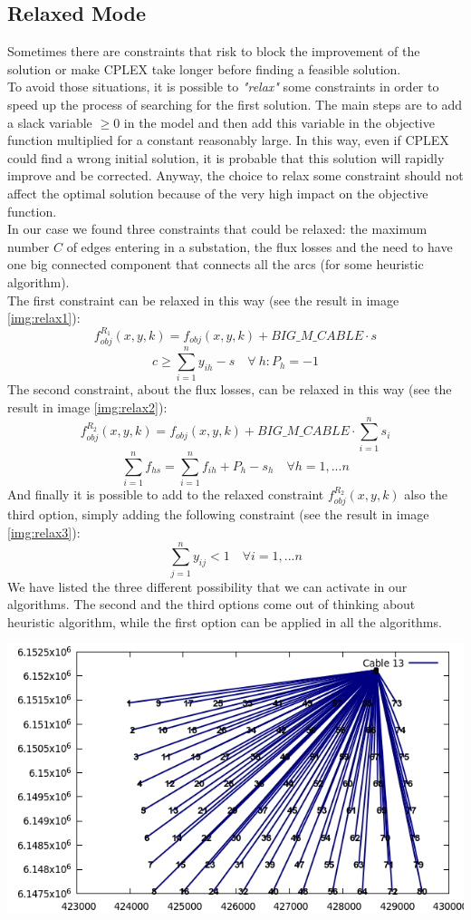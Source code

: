 \subsection{Relaxed Mode}
Sometimes there are constraints that risk to block the improvement of the solution or make \textsc{CPLEX} take longer before finding a feasible solution. \\
To avoid those situations, it is possible to \textit{"relax"} some constraints in order to speed up the process of searching for the first solution. The main steps are to add a slack variable $\geq 0$ in the model and then add this variable in the objective function multiplied for a constant reasonably large. In this way, even if \textsc{CPLEX} could find a wrong initial solution, it is probable that this solution will rapidly improve and be corrected. Anyway, the choice to relax some constraint should not affect the optimal solution because of the very high impact on the objective function. \\
In our case we found three constraints that could be relaxed: the maximum number $C$ of edges entering in a substation, the flux losses and the need to have one big connected component that connects all the arcs (for some heuristic algorithm). \\
The first constraint can be relaxed in this way (see the result in image \ref{img:relax1}):
\[
f^{R_1}_{obj} (x,y,k) = f_{obj} (x,y,k) + BIG\_M\_CABLE \cdot s
\]
\[
c \geq \sum^n_{i=1} y_{ih} -s \quad \forall \ h : P_h = -1
\]
The second constraint, about the flux losses, can be relaxed in this way (see the result in image \ref{img:relax2}):
\[
f^{R_2}_{obj} (x,y,k) = f_{obj} (x,y,k) + BIG\_M\_CABLE \cdot \sum^n_{i=1} s_i
\]
\[
\sum^n_{i=1} f_{hs} = \sum^n_{i=1} f_{ih} + P_h - s_h \quad \forall h = 1, ... n
\]
And finally it is possible to add to the relaxed constraint $f^{R_2}_{obj} (x,y,k)$ also the third option, simply adding the following constraint (see the result in image \ref{img:relax3}): 
\[
\sum^n_{j=1} y_{ij} < 1 \quad \forall i = 1, ... n
\]
We have listed the three different possibility that we can activate in our algorithms. The second and the third options come out of thinking about heuristic algorithm, while the first option can be applied in all the algorithms. 
\begin{center}
	\includegraphics[scale=0.4]{Graphics/data02-relax1.png}
	\label{img:relax1}
\end{center}

